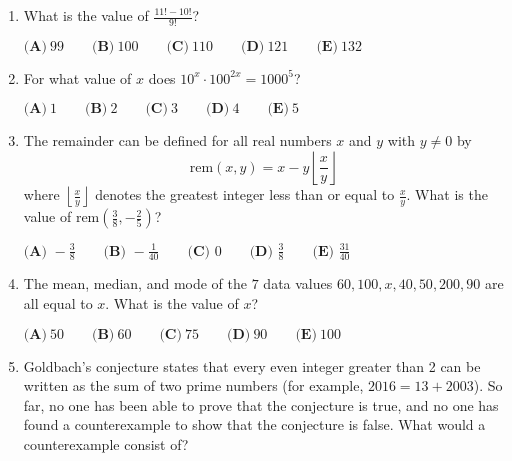 \documentclass{article}
\begin{document}
\begin{enumerate}[label=\arabic*., itemsep=0.5em]
\item What is the value of \(\frac{11!-10!}{9!}\)?

\(\textbf{(A)}\ 99\qquad\textbf{(B)}\ 100\qquad\textbf{(C)}\ 110\qquad\textbf{(D)}\ 121\qquad\textbf{(E)}\ 132\)\par \vspace{0.5em}\item For what value of \(x\) does \(10^x \cdot 100^{2x} = 1000^5\)?

\(\textbf{(A)}\ 1\qquad\textbf{(B)}\ 2\qquad\textbf{(C)}\ 3\qquad\textbf{(D)}\ 4\qquad\textbf{(E)}\ 5\)\par \vspace{0.5em}\item The remainder can be defined for all real numbers \(x\) and \(y\) with \(y \neq 0\) by 
\begin{equation*}
\text{rem} (x ,y)=x-y\left \lfloor \frac{x}{y} \right \rfloor
\end{equation*}
where \(\left \lfloor \tfrac{x}{y} \right \rfloor\) denotes the greatest integer less than or equal to \(\tfrac{x}{y}\). What is the value of \(\text{rem} (\tfrac{3}{8}, -\tfrac{2}{5} )\)?

\(\textbf{(A) } -\frac{3}{8} \qquad \textbf{(B) } -\frac{1}{40} \qquad \textbf{(C) } 0 \qquad \textbf{(D) } \frac{3}{8} \qquad \textbf{(E) } \frac{31}{40}\)\par \vspace{0.5em}\item The mean, median, and mode of the \(7\) data values \(60, 100, x, 40, 50, 200, 90\) are all equal to \(x\). What is the value of \(x\)?

\(\textbf{(A)}\ 50\qquad\textbf{(B)}\ 60\qquad\textbf{(C)}\ 75\qquad\textbf{(D)}\ 90\qquad\textbf{(E)}\ 100\)\par \vspace{0.5em}\item Goldbach's conjecture states that every even integer greater than 2 can be written as the sum of two prime numbers (for example, \(2016=13+2003\)). So far, no one has been able to prove that the conjecture is true, and no one has found a counterexample to show that the conjecture is false. What would a counterexample consist of?


\end{enumerate}
\end{document}
